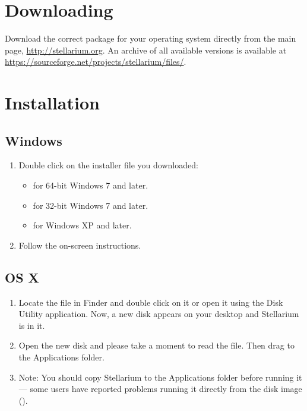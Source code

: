 \section{Downloading}
\label{sec:GettingStarted:Downloading}

Download the correct package for your operating system directly from the main page, \newline \url{http://stellarium.org}.
An archive of all available versions is available at \url{https://sourceforge.net/projects/stellarium/files/}.

\section{Installation}
\label{sec:GettingStarted:Installation}

\subsection{Windows}
\label{sec:GettingStarted:Installation:Windows}

\begin{enumerate}
\item Double click on the installer file you downloaded:
\begin{itemize}
\item {} for 64-bit Windows 7 and later.
\item {} for 32-bit Windows 7 and later.
\item {} for Windows XP and later.
\end{itemize}
\item Follow the on-screen instructions.
\end{enumerate}

\subsection{OS X}
\label{sec:GettingStarted:Installation:OSX}

\begin{enumerate}
\item
  Locate the  file in
  Finder and double click on it or open it using the Disk Utility
  application. Now, a new disk appears on your desktop and Stellarium is
  in it.
\item
  Open the new disk and please take a moment to read the  file.
  Then drag  to the Applications folder.
\item
  Note: You should copy Stellarium to the Applications folder before
  running it --- some users have reported problems running it directly
  from the disk image ().
\end{enumerate}

